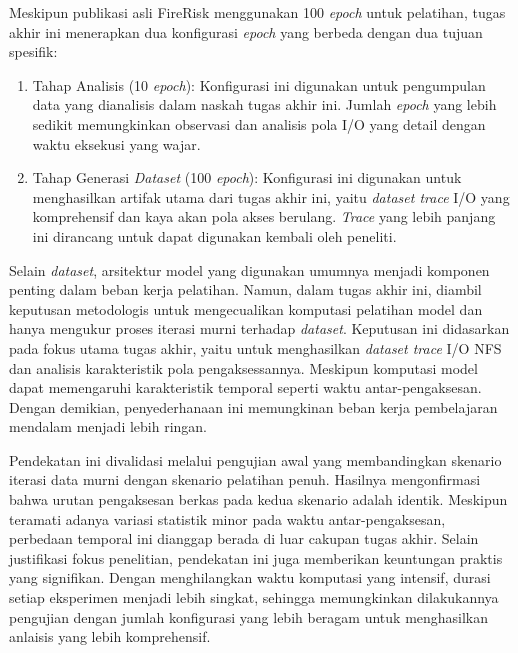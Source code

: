 Meskipun publikasi asli FireRisk menggunakan 100 \textit{epoch} untuk pelatihan, tugas akhir ini menerapkan dua konfigurasi \textit{epoch} yang berbeda dengan dua tujuan spesifik:
\begin{enumerate}
    \item Tahap Analisis (10 \textit{epoch}): Konfigurasi ini digunakan untuk pengumpulan data yang dianalisis dalam naskah tugas akhir ini. Jumlah \textit{epoch} yang lebih sedikit memungkinkan observasi dan analisis pola I/O yang detail dengan waktu eksekusi yang wajar.
    \item Tahap Generasi \textit{Dataset} (100 \textit{epoch}): Konfigurasi ini digunakan untuk menghasilkan artifak utama dari tugas akhir ini, yaitu \textit{dataset trace} I/O yang komprehensif dan kaya akan pola akses berulang. \textit{Trace} yang lebih panjang ini dirancang untuk dapat digunakan kembali oleh peneliti.
\end{enumerate}

Selain \textit{dataset}, arsitektur model yang digunakan umumnya menjadi komponen penting dalam beban kerja pelatihan. Namun, dalam tugas akhir ini, diambil keputusan metodologis untuk mengecualikan komputasi pelatihan model dan hanya mengukur proses iterasi murni terhadap \textit{dataset}. Keputusan ini didasarkan pada fokus utama tugas akhir, yaitu untuk menghasilkan \textit{dataset trace} I/O NFS dan analisis karakteristik pola pengaksessannya. Meskipun komputasi model dapat memengaruhi karakteristik temporal seperti waktu antar-pengaksesan. Dengan demikian, penyederhanaan ini memungkinan beban kerja pembelajaran mendalam menjadi lebih ringan.

Pendekatan ini divalidasi melalui pengujian awal yang membandingkan skenario iterasi data murni dengan skenario pelatihan penuh. Hasilnya mengonfirmasi bahwa urutan pengaksesan berkas pada kedua skenario adalah identik. Meskipun teramati adanya variasi statistik minor pada waktu antar-pengaksesan, perbedaan temporal ini dianggap berada di luar cakupan tugas akhir. Selain justifikasi fokus penelitian, pendekatan ini juga memberikan keuntungan praktis yang signifikan. Dengan menghilangkan waktu komputasi yang intensif, durasi setiap eksperimen menjadi lebih singkat, sehingga memungkinkan dilakukannya pengujian dengan jumlah konfigurasi yang lebih beragam untuk menghasilkan anlaisis yang lebih komprehensif.

